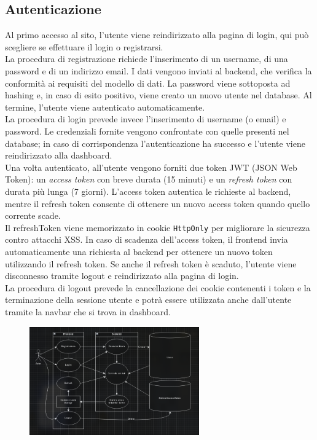 \documentclass[11pt]{article}
\begin{document}
\subsection{Autenticazione}
Al primo accesso al sito, l’utente viene reindirizzato alla pagina di login, qui può scegliere se effettuare il login o registrarsi. \\
La procedura di registrazione richiede l’inserimento di un username, di una password e di un indirizzo email. I dati vengono inviati al backend, che verifica la conformità ai requisiti del modello di dati. La password viene sottoposta ad hashing e, in caso di esito positivo, viene creato un nuovo utente nel database. Al termine, l’utente viene autenticato automaticamente. \\
La procedura di login prevede invece l’inserimento di username (o email) e password. Le credenziali fornite vengono confrontate con quelle presenti nel database; in caso di corrispondenza l’autenticazione ha successo e l’utente viene reindirizzato alla dashboard.\\
Una volta autenticato, all’utente vengono forniti due token JWT (JSON Web Token): un \textit{access token} con breve durata (15 minuti) e un \textit{refresh token} con durata più lunga (7 giorni). L’access token autentica le richieste al backend, mentre il refresh token consente di ottenere un nuovo access token quando quello corrente scade. \\
Il refreshToken viene memorizzato in cookie \texttt{HttpOnly} per migliorare la sicurezza contro attacchi XSS. In caso di scadenza dell’access token, il frontend invia automaticamente una richiesta al backend per ottenere un nuovo token utilizzando il refresh token. Se anche il refresh token è scaduto, l’utente viene disconnesso tramite logout e reindirizzato alla pagina di login. \\
La procedura di logout prevede la cancellazione dei cookie contenenti i token e la terminazione della sessione utente e potrà essere utilizzata anche dall'utente tramite la navbar che si trova in dashboard.
\begin{figure}[H]
    \centering
    \includegraphics[width=0.65\textwidth]{./Resources/Diagrams/UML-Autenticazione.png}
\end{figure}
\end{document}
